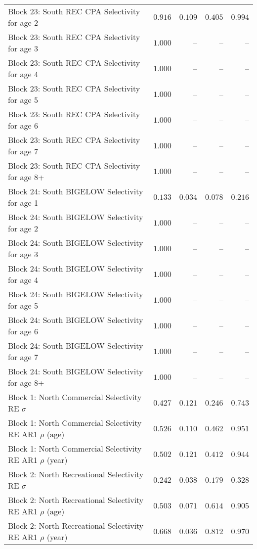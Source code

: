 \documentclass[
]{article}
\begin{document}
\begin{landscape}
\begin{longtable}[t]{lrrrr}
Block 23: South REC CPA Selectivity for age 2 & $0.916$ & $0.109$ & $0.405$ & $0.994$\\
\addlinespace
Block 23: South REC CPA Selectivity for age 3 & $1.000$ & -- & -- & --\\
Block 23: South REC CPA Selectivity for age 4 & $1.000$ & -- & -- & --\\
Block 23: South REC CPA Selectivity for age 5 & $1.000$ & -- & -- & --\\
Block 23: South REC CPA Selectivity for age 6 & $1.000$ & -- & -- & --\\
Block 23: South REC CPA Selectivity for age 7 & $1.000$ & -- & -- & --\\
\addlinespace
Block 23: South REC CPA Selectivity for age 8+ & $1.000$ & -- & -- & --\\
Block 24: South BIGELOW Selectivity for age 1 & $0.133$ & $0.034$ & $0.078$ & $0.216$\\
Block 24: South BIGELOW Selectivity for age 2 & $1.000$ & -- & -- & --\\
Block 24: South BIGELOW Selectivity for age 3 & $1.000$ & -- & -- & --\\
Block 24: South BIGELOW Selectivity for age 4 & $1.000$ & -- & -- & --\\
\addlinespace
Block 24: South BIGELOW Selectivity for age 5 & $1.000$ & -- & -- & --\\
Block 24: South BIGELOW Selectivity for age 6 & $1.000$ & -- & -- & --\\
Block 24: South BIGELOW Selectivity for age 7 & $1.000$ & -- & -- & --\\
Block 24: South BIGELOW Selectivity for age 8+ & $1.000$ & -- & -- & --\\
Block 1: North Commercial Selectivity RE $\sigma$ & $0.427$ & $0.121$ & $0.246$ & $0.743$\\
\addlinespace
Block 1: North Commercial Selectivity RE AR1 $\rho$ (age) & $0.526$ & $0.110$ & $0.462$ & $0.951$\\
Block 1: North Commercial Selectivity RE AR1 $\rho$ (year) & $0.502$ & $0.121$ & $0.412$ & $0.944$\\
Block 2: North Recreational Selectivity RE $\sigma$ & $0.242$ & $0.038$ & $0.179$ & $0.328$\\
Block 2: North Recreational Selectivity RE AR1 $\rho$ (age) & $0.503$ & $0.071$ & $0.614$ & $0.905$\\
Block 2: North Recreational Selectivity RE AR1 $\rho$ (year) & $0.668$ & $0.036$ & $0.812$ & $0.970$\\

\end{longtable}
\end{landscape}
\end{document}
